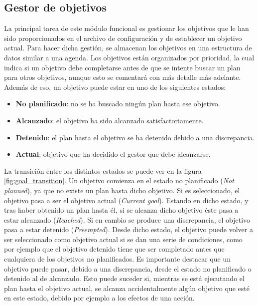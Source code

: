 \subsection{Gestor de objetivos}
\label{sec:goal-manager}

La principal tarea de este módulo funcional es gestionar los objetivos que le han sido proporcionados
en el archivo de configuración y de establecer un objetivo actual. Para hacer dicha gestión, se almacenan
los objetivos en una estructura de datos similar a una agenda. Los objetivos están organizados
por prioridad, la cual indica si un objetivo debe completarse antes de que se intente buscar un plan
para otros objetivos, aunque esto se comentará con más detalle más adelante. Además de eso, un objetivo
puede estar en uno de los siguientes estados:

\begin{itemize}[label=\textbullet]
    \item \textbf{No planificado}: no se ha buscado ningún plan hasta ese objetivo.
    \item \textbf{Alcanzado}: el objetivo ha sido alcanzado satisfactoriamente.
    \item \textbf{Detenido}: el plan hasta el objetivo se ha detenido debido a una discrepancia.
    \item \textbf{Actual}: objetivo que ha decidido el gestor que debe alcanzarse.
\end{itemize}

La transición entre los distintos estados se puede ver en la figura \ref{fig:goal_transition}.
Un objetivo comienza en el estado no planificado (\textit{Not planned}), ya que no existe un plan
hasta dicho objetivo. Si es seleccionado, el objetivo pasa a ser el objetivo actual (\textit{Current goal}).
Estando en dicho estado, y tras haber obtenido un plan hasta él, si se alcanza dicho objetivo éste
pasa a estar alcanzado (\textit{Reached}). Si en cambio se produce una discrepancia, el objetivo pasa
a estar detenido (\textit{Preempted}). Desde dicho estado, el objetivo puede volver a ser
seleccionado como objetivo actual si se dan una serie de condiciones, como por ejemplo que
el objetivo detenido tiene que ser completado antes que cualquiera de los objetivos no planificados.
Es importante destacar que un objetivo puede pasar, debido a una discrepancia, desde el estado
no planificado o detenido al de alcanzado. Esto puede suceder si, mientras se está ejecutando el plan
hasta el objetivo actual, se alcanza accidentalmente algún objetivo que esté en este estado, debido
por ejemplo a los efectos de una acción.

